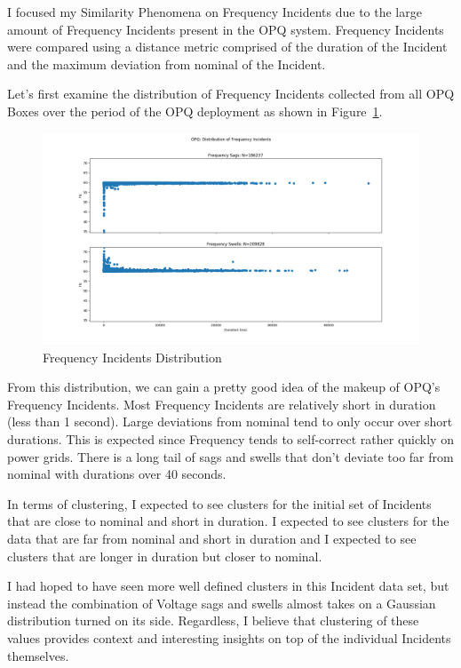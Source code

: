 I focused my Similarity Phenomena on Frequency Incidents due to the large amount of Frequency Incidents present in the OPQ system. Frequency Incidents were compared using a distance metric comprised of the duration of the Incident and the maximum deviation from nominal of the Incident.

Let's first examine the distribution of Frequency Incidents collected from all OPQ Boxes over the period of the OPQ deployment as shown in Figure~\ref{fig:f_incident_dist}.

\begin{figure}[H]
    \centering
    \includegraphics[width=\linewidth]{figures/f_incident_dist.png}
    \caption{Frequency Incidents Distribution}
    \label{fig:f_incident_dist}
\end{figure}

From this distribution, we can gain a pretty good idea of the makeup of OPQ's Frequency Incidents. Most Frequency Incidents are relatively short in duration (less than 1 second). Large deviations from nominal tend to only occur over short durations. This is expected since Frequency tends to self-correct rather quickly on power grids. There is a long tail of sags and swells that don't deviate too far from nominal with durations over 40 seconds.

In terms of clustering, I expected to see clusters for the initial set of Incidents that are close to nominal and short in duration. I expected to see clusters for the data that are far from nominal and short in duration and I expected to see clusters that are longer in duration but closer to nominal.

I had hoped to have seen more well defined clusters in this Incident data set, but instead the combination of Voltage sags and swells almost takes on a Gaussian distribution turned on its side. Regardless, I believe that clustering of these values provides context and interesting insights on top of the individual Incidents themselves.

